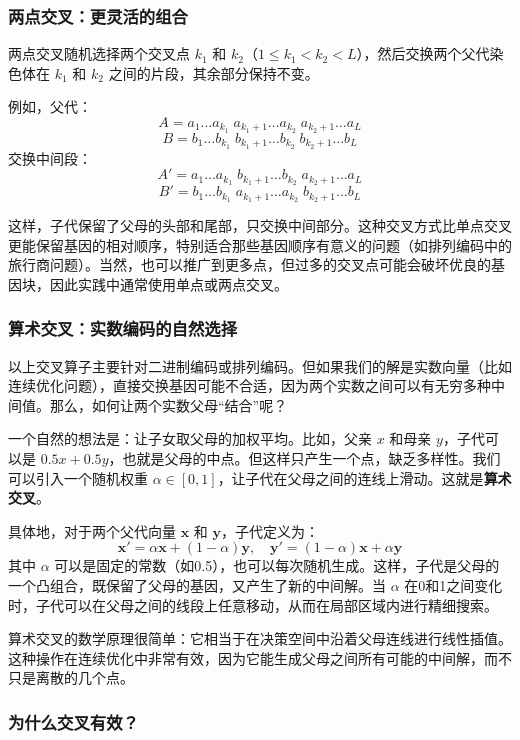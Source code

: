 \documentclass[lang=cn,zihao=-4,a4paper,fontset=windows]{beautybook}
\begin{document}
\subsubsection{两点交叉：更灵活的组合}

两点交叉随机选择两个交叉点 \(k_1\) 和 \(k_2\)（\(1 \le k_1 < k_2 < L\)），然后交换两个父代染色体在 \(k_1\) 和 \(k_2\) 之间的片段，其余部分保持不变。

例如，父代：
\[
A = a_1 \dots a_{k_1} \; a_{k_1+1} \dots a_{k_2} \; a_{k_2+1} \dots a_L
\]
\[
B = b_1 \dots b_{k_1} \; b_{k_1+1} \dots b_{k_2} \; b_{k_2+1} \dots b_L
\]
交换中间段：
\[
A' = a_1 \dots a_{k_1} \; b_{k_1+1} \dots b_{k_2} \; a_{k_2+1} \dots a_L
\]
\[
B' = b_1 \dots b_{k_1} \; a_{k_1+1} \dots a_{k_2} \; b_{k_2+1} \dots b_L
\]

这样，子代保留了父母的头部和尾部，只交换中间部分。这种交叉方式比单点交叉更能保留基因的相对顺序，特别适合那些基因顺序有意义的问题（如排列编码中的旅行商问题）。当然，也可以推广到更多点，但过多的交叉点可能会破坏优良的基因块，因此实践中通常使用单点或两点交叉。

\subsubsection{算术交叉：实数编码的自然选择}

以上交叉算子主要针对二进制编码或排列编码。但如果我们的解是实数向量（比如连续优化问题），直接交换基因可能不合适，因为两个实数之间可以有无穷多种中间值。那么，如何让两个实数父母“结合”呢？

一个自然的想法是：让子女取父母的加权平均。比如，父亲 \(x\) 和母亲 \(y\)，子代可以是 \(0.5x + 0.5y\)，也就是父母的中点。但这样只产生一个点，缺乏多样性。我们可以引入一个随机权重 \(\alpha \in [0,1]\)，让子代在父母之间的连线上滑动。这就是\textbf{算术交叉}。

具体地，对于两个父代向量 \(\mathbf{x}\) 和 \(\mathbf{y}\)，子代定义为：
\[
\mathbf{x}' = \alpha \mathbf{x} + (1-\alpha) \mathbf{y}, \quad \mathbf{y}' = (1-\alpha) \mathbf{x} + \alpha \mathbf{y}
\]
其中 \(\alpha\) 可以是固定的常数（如0.5），也可以每次随机生成。这样，子代是父母的一个凸组合，既保留了父母的基因，又产生了新的中间解。当 \(\alpha\) 在0和1之间变化时，子代可以在父母之间的线段上任意移动，从而在局部区域内进行精细搜索。

算术交叉的数学原理很简单：它相当于在决策空间中沿着父母连线进行线性插值。这种操作在连续优化中非常有效，因为它能生成父母之间所有可能的中间解，而不只是离散的几个点。

\subsubsection{为什么交叉有效？}
\end{document}
